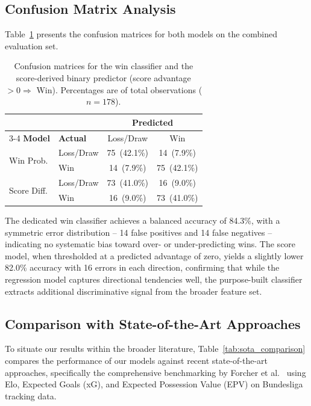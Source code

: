 \documentclass[a4paper,twoside]{article}
\begin{document}
\subsection{Confusion Matrix Analysis}

Table~\ref{tab:confusion} presents the confusion matrices for both models on the combined evaluation set.

\begin{table}[H]
\centering
\caption{Confusion matrices for the win classifier and the score-derived binary predictor (score advantage $> 0 \Rightarrow$ Win). Percentages are of total observations ($n = 178$).}
\label{tab:confusion}
\small
\begin{tabular}{l l c c}
\toprule
& & \multicolumn{2}{c}{\textbf{Predicted}} \\
\cmidrule(lr){3-4}
\textbf{Model} & \textbf{Actual} & Loss/Draw & Win \\
\midrule
\multirow{2}{*}{Win Prob.}
  & Loss/Draw & 75~(42.1\%) & 14~(7.9\%) \\
  & Win       & 14~(7.9\%) & 75~(42.1\%) \\
\midrule
\multirow{2}{*}{Score Diff.}
  & Loss/Draw & 73~(41.0\%) & 16~(9.0\%) \\
  & Win       & 16~(9.0\%) & 73~(41.0\%) \\
\bottomrule
\end{tabular}
\end{table}

\noindent
The dedicated win classifier achieves a balanced accuracy of 84.3\%, with a symmetric error distribution -- 14 false positives and 14 false negatives -- indicating no systematic bias toward over- or under-predicting wins.
The score model, when thresholded at a predicted advantage of zero, yields a slightly lower 82.0\% accuracy with 16 errors in each direction, confirming that while the regression model captures directional tendencies well, the purpose-built classifier extracts additional discriminative signal from the broader feature set.

\subsection{Comparison with State-of-the-Art Approaches}

To situate our results within the broader literature, Table~\ref{tab:sota_comparison} compares the performance of our models against recent state-of-the-art approaches, specifically the comprehensive benchmarking by Forcher et al.\ \cite{forcher_ai_2025} using Elo, Expected Goals (xG), and Expected Possession Value (EPV) on Bundesliga tracking data.
\end{document}
